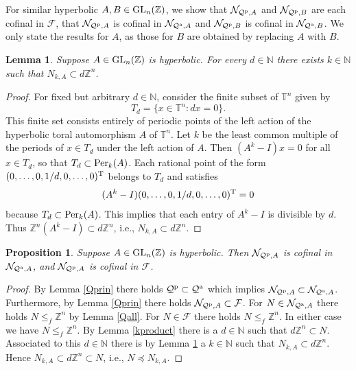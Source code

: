 \documentclass{amsart}
\theoremstyle{plain}
\newtheorem{lemma}[theorem]{Lemma}
\newtheorem{proposition}[theorem]{Proposition}
\theoremstyle{definition}
\theoremstyle{remark}
\begin{document}
For similar hyperbolic $A,B\in {\rm GL}_n({\mathbb Z})$, we show that ${\mathcal N}_{ {\mathcal Q}^{\rm p},A}$ and ${\mathcal N}_{ {\mathcal Q}^{\rm p},B}$ are each cofinal in ${\mathcal F}$, that ${\mathcal N}_{ {\mathcal Q}^{\rm p},A}$ is cofinal in ${\mathcal N}_{ {\mathcal Q}^{\rm a},A}$ and  ${\mathcal N}_{ {\mathcal Q}^{\rm p},B}$ is cofinal in ${\mathcal N}_{ {\mathcal Q}^{\rm a},B}$. We only state the results for $A$, as those for $B$ are obtained by replacing $A$ with $B$.

\begin{lemma}\label{dksubset} Suppose $A\in {\rm GL}_n({\mathbb Z})$ is hyperbolic. For every $d\in {\mathbb N}$ there exists $k\in{\mathbb N}$ such that $N_{k,A}\subset d{\mathbb Z}^n$.
\end{lemma}

\begin{proof} For fixed but arbitrary $d\in{\mathbb N}$, consider the finite subset of ${\mathbb T}^n$ given by
\[ T_d = \{ x\in {\mathbb T}^n: dx = 0\}.\]
This finite set consists entirely of periodic points of the left action of the hyperbolic toral automorphism $A$ of ${\mathbb T}^n$. Let $k$ be the least common multiple of the periods of $x\in T_d$ under the left action of $A$. Then $(A^k-I)x = 0$ for all $x\in T_d$, so that $T_d\subset {\rm Per}_k(A)$. Each rational point of the form $(0,\dots,0,1/d,0,\dots,0)^{\rm T}$ belongs to $T_d$ and satisfies
\[ (A^k-I)(0,\dots,0,1/d,0,\dots,0)^{\rm T} = 0\]
because $T_d\subset {\rm Per}_k(A)$. This implies that each entry of $A^k-I$ is divisible by $d$. Thus ${\mathbb Z}^n(A^k-I)\subset d{\mathbb Z}^n$, i.e., $N_{k,A}\subset d{\mathbb Z}^n$.
\end{proof}

\begin{proposition}\label{cofinal} Suppose $A\in {\rm GL}_n({\mathbb Z})$ is hyperbolic. Then ${\mathcal N}_{ {\mathcal Q}^{\rm p},A}$ is cofinal in ${\mathcal N}_{ {\mathcal Q}^{\rm a},A}$, and ${\mathcal N}_{ {\mathcal Q}^{\rm p},A}$ is cofinal in ${\mathcal F}$.
\end{proposition}

\begin{proof} By Lemma \ref{Qprin} there holds ${\mathcal Q}^{\rm p}\subset {\mathcal Q}^{\rm a}$ which implies ${\mathcal N}_{{\mathcal Q}^{\rm p},A}\subset {\mathcal N}_{ {\mathcal Q}^{\rm a},A}$. Furthermore, by Lemma \ref{Qprin} there holds ${\mathcal N}_{{\mathcal Q}^{\rm p},A} \subset {\mathcal F}$. For $N\in {\mathcal N}_{ {\mathcal Q}^{\rm a},A}$ there holds $N\leq_f {\mathbb Z}^n$ by Lemma \ref{Qall}. For $N\in {\mathcal F}$ there holds $N\leq_f {\mathbb Z}^n$. In either case we have $N\leq_f {\mathbb Z}^n$. By Lemma \ref{kproduct} there is a $d\in{\mathbb N}$ such that $d{\mathbb Z}^n\subset N$. Associated to this $d\in {\mathbb N}$ there is by Lemma \ref{dksubset} a $k\in{\mathbb N}$ such that $N_{k,A}\subset d{\mathbb Z}^n$. Hence $N_{k,A} \subset d{\mathbb Z}^n \subset N$, i.e., $N\preceq N_{k,A}$.
\end{proof}
\end{document}
